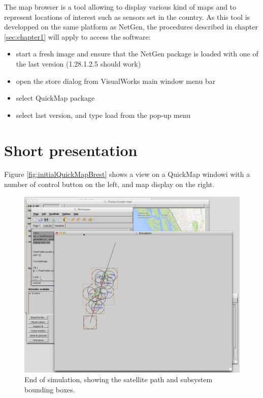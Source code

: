 The map browser is a tool allowing to display various kind of maps and to represent 
locations of interest such as sensors set in the country. 
As this tool is developped on the same platform as NetGen, the procedures described 
in chapter \ref{sec:chapter1} will apply to access the software: 
\begin{itemize}
\item start a fresh image and ensure that the NetGen package is loaded with one of the last version (1.28.1.2.5 should work)
\item open the store dialog from VisualWorks main window menu bar
\item select QuickMap package 
\item select last version, and type load from the pop-up menu
\end{itemize}

\section{Short presentation}

Figure 
\ref{fig:initialQuickMapBrest} shows a view on a QuickMap windowi with a number
of control button on the left, and map display on the right.


\begin{figure}[hbtp]
\begin{center}
\includegraphics[width=12cm]{QuickMapDemo.png} 
\caption{End of simulation, showing the satellite path and subsystem bounding boxes.}
\label{fig:QuickMapDemo}
\end{center} 
\end{figure}

